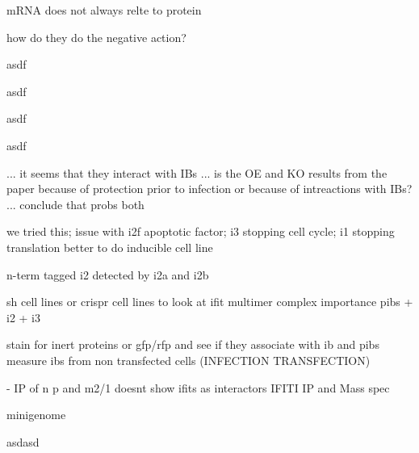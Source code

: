 mRNA does not always relte to protein \cite{Liu2016OnAbundance, Buccitelli2020MRNAsControl}


how do they do the negative action?

asdf

asdf

asdf

asdf


... it seems that they interact with IBs ... is the OE and KO results from the paper because of protection prior to infection or because of intreactions with IBs? ... conclude that probs both



we tried this; issue with i2f apoptotic factor; i3 stopping cell cycle; i1 stopping translation
better to do inducible cell line

n-term tagged i2 detected by i2a and i2b

sh cell lines or crispr cell lines to look at ifit multimer complex importance
pibs + i2 + i3

stain for inert proteins or gfp/rfp and see if they associate with ib and pibs
measure ibs from non transfected cells (INFECTION TRANSFECTION)

\cite{Oliveira2013HumanCells} - IP of n p and m2/1 doesnt show ifits as interactors
IFITI IP and Mass spec

minigenome

asdasd





